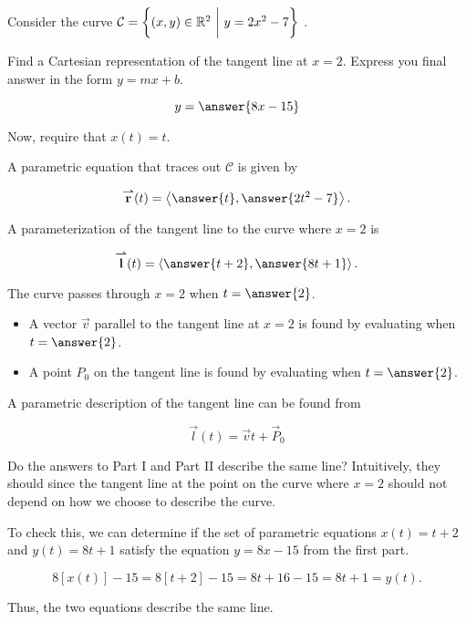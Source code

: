 \documentclass{ximera}
\author{Jim Talamo}
\begin{document}
\begin{exercise}

Consider the curve $\mathcal{C} = \left\{(x,y) \in \mathbb R^2 ~ \bigg| ~ y=2x^2-7\right\}$ .

Find a Cartesian representation of the tangent line at $x=2$.  Express you final answer in the form $y=mx+b$.

\[
y= \answer{8x-15}
\]

\begin{exercise}
Now, require that $x(t) =t$.  

A parametric equation that traces out $\mathcal{C}$ is given by

\[
\vec{r}(t) = \vector{\answer{t},\answer{2t^2-7}}.
\]

A parameterization of the tangent line to the curve where $x=2$ is

\[
\vec{l}(t)=\vector{\answer{t+2},\answer{8t+1}}.
\]

\begin{hint}
The curve passes through $x=2$ when $t=\answer{2}$.  

\begin{itemize}
\item A vector $\vec{v}$ parallel to the tangent line at $x=2$ is found by evaluating  when $t=\answer{2}$.
\item A point $P_0$ on the tangent line is found by evaluating  when $t=\answer{2}$.
\end{itemize}

A parametric description of the tangent line can be found from 

\[\vec{l}(t) = \vec{v}t+\vec{P}_0\]

\end{hint}

\begin{feedback}[correct]
Do the answers to Part I and Part II describe the same line?  Intuitively, they should since the tangent line at the point on the curve where $x=2$ should not depend on how we choose to describe the curve.

To check this, we can determine if the set of parametric equations $x(t)=t+2$ and $y(t)=8t+1$ satisfy the equation $y=8x-15$ from the first part.

\[
8[x(t)]-15 = 8 [t+2] -15 = 8t+16-15 = 8t+1=y(t).
\] 

Thus, the two equations describe the same line.
\end{feedback}
\end{exercise}
\end{exercise}
\end{document}
